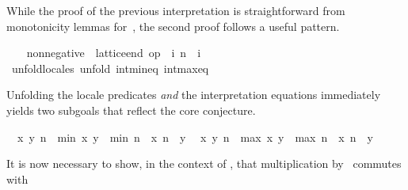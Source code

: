 \begin{isabellebody}
%
\begin{isamarkuptext}%
While the proof of the previous interpretation
  is straightforward from monotonicity lemmas for~, the
  second proof follows a useful pattern.%
\end{isamarkuptext}%
\isamarkuptrue%
%
\isadelimvisible
\ \ %
\endisadelimvisible
%
\isatagvisible
{}\isamarkupfalse%
\ non{}negative\ {}\ lattice{}end\ {}op\ {}{}\ {}{}i{}\ n\ {}\ i{}\isanewline
\ \ \isamarkupfalse%
\ {}unfold{}locales{}\ unfold\ int{}min{}eq\ int{}max{}eq{}%
\begin{isamarkuptxt}%
\normalsize Unfolding the locale predicates \emph{and} the
      interpretation equations immediately yields two subgoals that
      reflect the core conjecture.
      \begin{isabelle}%
\ {}{}\ {}x\ y{}\ n\ {}\ min\ x\ y\ {}\ min\ {}n\ {}\ x{}\ {}n\ {}\ y{}\isanewline
\ {}{}\ {}x\ y{}\ n\ {}\ max\ x\ y\ {}\ max\ {}n\ {}\ x{}\ {}n\ {}\ y{}%
\end{isabelle}
      It is now necessary to show, in the context of , that multiplication by~ commutes with

\end{isamarkuptxt}
\end{isabellebody}
